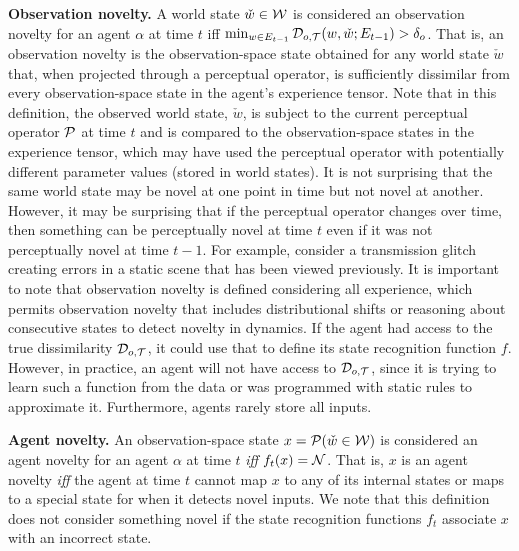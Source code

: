 {\bf Observation novelty.} A world state $\check{w}\in{\cal W}$ is considered an observation novelty for an agent $\alpha$ at time $t$ iff $\min_{w \in E_{t-1}} {\cal D}_{o,{\cal T}} (w,\check{w};E_{t-1}) > \delta_o$.
That is, an observation novelty is the observation-space state obtained for any world state $\check{w}$ that, when projected through a perceptual operator, is sufficiently dissimilar from every observation-space state in the agent's experience tensor.
Note that in this definition, the observed world state, $\check{w}$, is subject to the current perceptual operator ${\cal P}$ at time $t$ and is compared to the observation-space states in the experience tensor, which may have used the perceptual operator with potentially different parameter values (stored in world states).
It is not surprising that the same world state may be novel at one point in time but not novel at another. However, it may be surprising that if the perceptual operator changes over time, then something can be perceptually novel at time $t$ even if it was not perceptually novel at time $t-1$. For example, consider a transmission glitch creating errors in a static scene that has been viewed previously.
It is important to note that observation novelty is defined considering all experience, which permits observation novelty that includes distributional shifts or reasoning about consecutive states to detect novelty in dynamics.  
If the agent had access to the true dissimilarity ${\cal D}_{o,{\cal T}}$, it could use that to define its state recognition function $f$.  However, in practice, an agent will not have access to ${\cal D}_{o,{\cal T}}$, since it is trying to learn such a function from the data or was programmed with static rules to approximate it. Furthermore, agents rarely store all inputs. 


{\bf Agent novelty.} An observation-space state $x={\cal P}(\check{w}\in{\cal W})$ is considered an agent novelty for an agent $\alpha$ at time $t$ {\em iff} $f_t(x) = {\cal N}$. That is, $x$ is an agent novelty {\em iff} the agent at time $t$ cannot map $x$ to any of its internal states or maps to a special state for when it detects novel inputs.  We note that this definition does not consider something novel if the state recognition functions $f_t$ associate $x$ with an incorrect state. 


